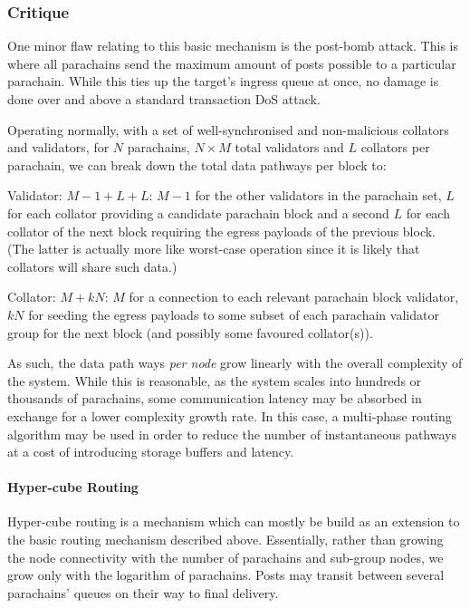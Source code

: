 \documentclass[9pt,oneside]{amsart}
\begin{document}
\begin{multicols}{2}
\subsubsection{Critique}
\label{critique}

 One minor flaw relating to this basic mechanism is the post-bomb attack. This is where all parachains send the maximum amount of posts possible to a particular parachain. While this ties up the target's ingress queue at once, no damage is done over and above a standard transaction DoS attack.

 Operating normally, with a set of well-synchronised and non-malicious collators and validators, for $N$ parachains, $N \times M$ total validators and $L$ collators per parachain, we can break down the total data pathways per block to:

 Validator: $M - 1 + L + L$: $M - 1$ for the other validators in the parachain set, $L$ for each collator providing a candidate parachain block and a second $L$ for each collator of the next block requiring the egress payloads of the previous block. (The latter is actually more like worst-case operation since it is likely that collators will share such data.)

 Collator: $M + kN$: $M$ for a connection to each relevant parachain block validator, $kN$ for seeding the egress payloads to some subset of each parachain validator group for the next block (and possibly some favoured collator(s)).

As such, the data path ways \emph{per node} grow linearly with the overall complexity of the system. While this is reasonable, as the system scales into hundreds or thousands of parachains, some communication latency may be absorbed in exchange for a lower complexity growth rate. In this case, a multi-phase routing algorithm may be used in order to reduce the number of instantaneous pathways at a cost of introducing storage buffers and latency.

\paragraph{Hyper-cube Routing}
\label{hyper-cube-routing}

 Hyper-cube routing is a mechanism which can mostly be build as an extension to the basic routing mechanism described above. Essentially, rather than growing the node connectivity with the number of parachains and sub-group nodes, we grow only with the logarithm of parachains. Posts may transit between several parachains' queues on their way to final delivery.


\end{multicols}
\end{document}
